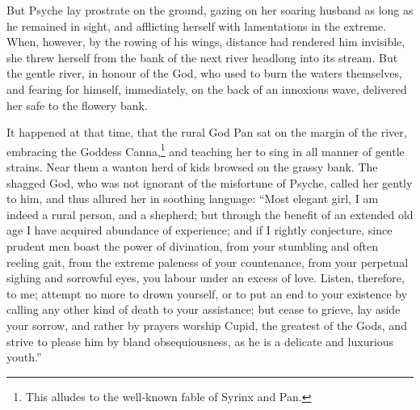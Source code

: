 \documentclass[12pt]{article}
\begin{document}
But Psyche lay prostrate on the ground, gazing on her soaring husband as long
as he remained in sight, and afflicting herself with lamentations in the
extreme. When, however, by the rowing of his wings, distance had rendered him
invisible, she threw herself from the bank of the next river headlong into its
stream. But the gentle river, in honour of the God, who used to burn the waters
themselves, and fearing for himself, immediately, on the back of an innoxious
wave, delivered her safe to the flowery bank.

It happened at that time, that the rural God Pan sat on the margin of the
river, embracing the Goddess Canna,\footnote{This alludes to the well-known
fable of Syrinx and Pan.} and teaching her to sing in all manner of gentle
strains. Near them a wanton herd of kids browsed on the grassy bank. The
shagged God, who was not ignorant of the misfortune of Psyche, called her
gently to him, and thus allured her in soothing language: ``Most elegant girl,
I am indeed a rural person, and a shepherd; but through the benefit of an
extended old age I have acquired abundance of experience; and if I rightly
conjecture, since prudent men boast the power of divination, from your
stumbling and often reeling gait, from the extreme paleness of your
countenance, from your perpetual sighing and sorrowful eyes, you labour under
an excess of love. Listen, therefore, to me; attempt no more to drown yourself,
or to put an end to your existence by calling any other kind of death to your
assistance; but cease to grieve, lay aside your sorrow, and rather by prayers
worship Cupid, the greatest of the Gods, and strive to please him by bland
obsequiousness, as he is a delicate and luxurious youth.''
\end{document}
